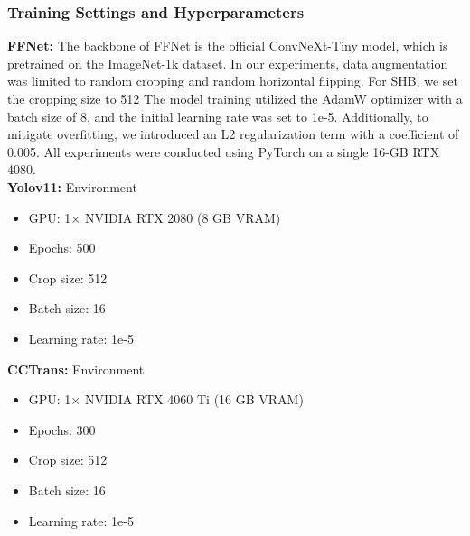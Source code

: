 \subsubsection{Training Settings and Hyperparameters}
\textbf{FFNet: } The backbone of FFNet is the official ConvNeXt-Tiny model, which is pretrained on the ImageNet-1k dataset. In our experiments, data augmentation was limited to random cropping and random horizontal flipping. For SHB, we set the cropping size to 512  The model training utilized the AdamW optimizer with a batch size of 8, and the initial learning rate was set to 1e-5. Additionally, to mitigate overfitting, we introduced an L2 regularization term with a coefficient of 0.005. All experiments were conducted using PyTorch on a single 16-GB RTX 4080. \\
\textbf{Yolov11: }Environment
        \begin{itemize}
            \item GPU: 1× NVIDIA RTX 2080 (8 GB VRAM)
            \item Epochs: 500
            \item Crop size: 512
            \item Batch size: 16
            \item Learning rate: 1e-5
        \end{itemize}
\textbf{CCTrans: }Environment
        \begin{itemize}
            \item GPU: 1× NVIDIA RTX 4060 Ti (16 GB VRAM)
            \item Epochs: 300
            \item Crop size: 512
            \item Batch size: 16
            \item Learning rate: 1e-5
        \end{itemize}
